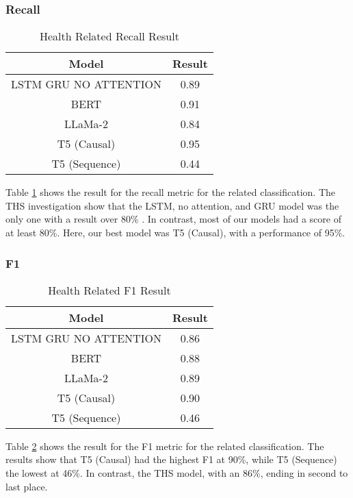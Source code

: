 \subsubsection{Recall}
\begin{table}[htbp]
	\centering
	\caption{Health Related Recall Result}
	{\small
	\begin{tabular}{||c | c||} 
		\hline
		\textbf{Model} & \textbf{Result} \\
		\hline
		LSTM GRU NO ATTENTION & 0.89  \\
		\hline
		BERT & 0.91  \\
		\hline
		LLaMa-2 & 0.84 \\ 
		\hline
		T5 (Causal) & 0.95 \\
		\hline
		T5 (Sequence) & 0.44 \\
		\hline
	\end{tabular}
	}
	\label{table:HealthRecall}
\end{table}

Table \ref{table:HealthRecall} shows the result for the recall metric for the related classification. The THS investigation show that the LSTM, no attention, and
GRU model was the only one with a result over 80\% \cite{8622504}. In contrast, most of our models had a score of at least 80\%. Here, our best model was T5
(Causal), with a performance of 95\%.

\subsubsection{F1}
\begin{table}[htbp]
	\centering
	\caption{Health Related F1 Result}
	{\small
	\begin{tabular}{||c | c||} 
		\hline
		\textbf{Model} & \textbf{Result} \\
		\hline
		LSTM GRU NO ATTENTION & 0.86  \\
		\hline
		BERT & 0.88  \\
		\hline
		LLaMa-2 & 0.89 \\ 
		\hline
		T5 (Causal) & 0.90 \\
		\hline
		T5 (Sequence) & 0.46 \\
		\hline
	\end{tabular}
	}
	\label{table:HealthF1}
\end{table}

Table \ref{table:HealthF1} shows the result for the F1 metric for the related classification. The results show that T5 (Causal) had the highest F1 at 90\%, while T5 (Sequence)
the lowest at 46\%. In contrast, the THS model, with an 86\%, ending in second to last place.

